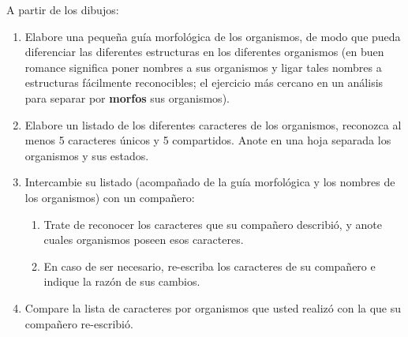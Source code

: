 A partir de los dibujos:

\begin{enumerate}
	\item Elabore una peque\~na gu\'ia morfol\'ogica de los organismos, 
	de modo que pueda diferenciar las diferentes estructuras en los 
	diferentes organismos (en buen romance significa poner nombres a 
	sus organismos y ligar tales nombres a estructuras f\'acilmente 
	reconocibles; el ejercicio m\'as cercano en un an\'alisis para 
	separar por \textbf{morfos} sus organismos).
	
	\item Elabore un listado de los diferentes caracteres de los 
	organismos, reconozca al menos 5 caracteres \'unicos y 5 
	compartidos. Anote en una hoja separada los organismos y sus 
	estados. 
	
	\item Intercambie su listado (acompa\~nado de la gu\'ia 
	morfol\'ogica y los nombres de los organismos) con un compa\~nero: 

	  \begin{enumerate}
	
		\item Trate de reconocer los caracteres que su compa\~nero 
		describi\'o, y anote cuales organismos poseen esos caracteres.
	
		\item En caso de ser necesario, re-escriba los caracteres de su 
		compa\~nero e indique la raz\'on de sus cambios.
	
	  \end{enumerate}

	\item Compare la lista de caracteres por organismos que usted 
	realiz\'o con la que su compa\~nero re-escribi\'o.

\end{enumerate}


